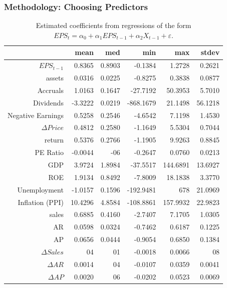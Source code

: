 \documentclass{beamer}
\newcommand\Fontvi{\fontsize{8}{7.2}\selectfont}
\begin{document}
\begin{frame}
\frametitle{Methodology: Choosing Predictors}
\begin{table}
\Fontvi
\centering
\begin{tabular}{rrrrrr}
  \hline
 & mean & med & min & max & stdev \\ 
  \hline
$EPS_{t-1}$ & 0.8365 & 0.8903 & -0.1384 & 1.2728 & 0.2621 \\ 
  assets & 0.0316 & 0.0225 & -0.8275 & 0.3838 & 0.0877 \\ 
  Accruals & 1.0163 & 0.1647 & -27.7192 & 50.3953 & 5.7010 \\ 
  Dividends & -3.3222 & 0.0219 & -868.1679 & 21.1498 & 56.1218 \\ 
  Negative Earnings & 0.5258 & 0.2546 & -4.6542 & 7.1198 & 1.4530 \\ 
  $\Delta Price$ & 0.4812 & 0.2580 & -1.1649 & 5.5304 & 0.7044 \\ 
  return & 0.5376 & 0.2766 & -1.1905 & 9.9263 & 0.8845 \\ 
  PE Ratio & -0.0044 & -06 & -0.2647 & 0.0760 & 0.0213 \\ 
  GDP & 3.9724 & 1.8984 & -37.5517 & 144.6891 & 13.6927 \\ 
  ROE & 1.9134 & 0.8492 & -7.8009 & 18.1838 & 3.3770 \\ 
  Unemployment & -1.0157 & 0.1596 & -192.9481 & 678 & 21.0969 \\ 
  Inflation (PPI) & 10.4296 & 4.8584 & -108.8861 & 157.9932 & 22.9823 \\ 
  sales & 0.6885 & 0.4160 & -2.7407 & 7.1705 & 1.0305 \\ 
  AR & 0.0598 & 0.0324 & -0.7462 & 0.6187 & 0.1225 \\ 
  AP & 0.0656 & 0.0444 & -0.9054 & 0.6850 & 0.1384 \\ 
  $\Delta Sales$ & 04 & 01 & -0.0018 & 0.0066 & 08 \\ 
  $\Delta AR$ & 0.0014 & 04 & -0.0107 & 0.0359 & 0.0041 \\ 
$\Delta AP$ & 0.0020 & 06 & -0.0202 & 0.0523 & 0.0069 \\ 
   \hline
\end{tabular}
\caption{Estimated coefficients from regressions of the form $EPS_{t} = \alpha_0 + \alpha_{1}EPS_{t-1} + \alpha_{2}X_{t-1} +\varepsilon$.} 
\label{univariate-stats-eps}
\end{table}
\end{frame}
\end{document}
